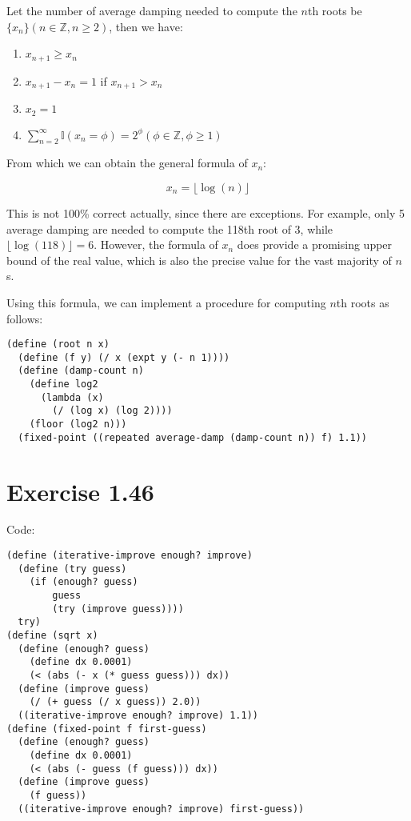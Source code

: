 \documentclass[../main.tex]{subfiles}
\begin{document}
Let the number of average damping needed to
 compute the $n$th roots be
 $\{x_n\}(n\in\mathbb{Z},n\geq2)$, then we have:

\begin{enumerate}
\item $x_{n+1}\geq x_n$
\item $x_{n+1}-x_n=1$ if $x_{n+1}>x_n$
\item $x_2 = 1$
\item $\sum_{n=2}^\infty\mathbb{I}(x_n=\phi)=2^\phi(\phi\in\mathbb{Z},\phi\geq1)$
\end{enumerate}

From which we can obtain the general formula of $x_n$:

$$
x_n = \lfloor\log(n)\rfloor
$$

This is not 100\% correct actually, since there are
 exceptions. For example, only 5 average damping are
 needed to compute the 118th root of 3, while
 $\lfloor\log(118)\rfloor=6$. However, the formula
 of $x_n$ does provide a promising upper bound of
 the real value, which is also the precise value for
 the vast majority of $n$s.

Using this formula, we can implement a procedure for computing
 $n$th roots as follows:

\begin{lstlisting}
(define (root n x)
  (define (f y) (/ x (expt y (- n 1))))
  (define (damp-count n)
    (define log2
      (lambda (x)
        (/ (log x) (log 2))))
    (floor (log2 n)))
  (fixed-point ((repeated average-damp (damp-count n)) f) 1.1))
\end{lstlisting}

\section{Exercise 1.46}

Code:

\begin{lstlisting}
(define (iterative-improve enough? improve)
  (define (try guess)
    (if (enough? guess)
        guess
        (try (improve guess))))
  try)
(define (sqrt x)
  (define (enough? guess)
    (define dx 0.0001)
    (< (abs (- x (* guess guess))) dx))
  (define (improve guess)
    (/ (+ guess (/ x guess)) 2.0))
  ((iterative-improve enough? improve) 1.1))
(define (fixed-point f first-guess)
  (define (enough? guess)
    (define dx 0.0001)
    (< (abs (- guess (f guess))) dx))
  (define (improve guess)
    (f guess))
  ((iterative-improve enough? improve) first-guess))
\end{lstlisting}
\end{document}
